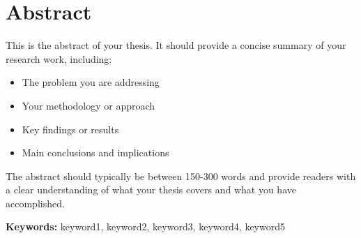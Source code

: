 \chapter*{Abstract}

This is the abstract of your thesis. It should provide a concise summary of your research work, including:

\begin{itemize}
    \item The problem you are addressing
    \item Your methodology or approach
    \item Key findings or results
    \item Main conclusions and implications
\end{itemize}

The abstract should typically be between 150-300 words and provide readers with a clear understanding of what your thesis covers and what you have accomplished.

\textbf{Keywords:} keyword1, keyword2, keyword3, keyword4, keyword5

\cleardoublepage